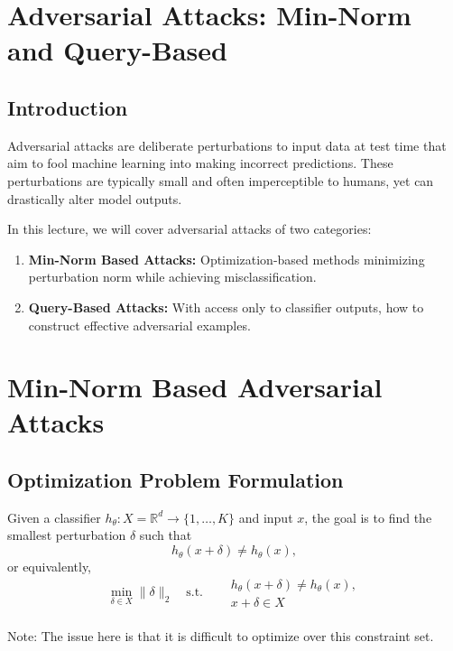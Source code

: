 \documentclass[11pt]{report}
\begin{document}

\maketitle


\section{Adversarial Attacks: Min-Norm and Query-Based}

\subsection*{Introduction}
Adversarial attacks are deliberate perturbations to input data at test time that aim to fool machine learning into making incorrect predictions. These perturbations are typically small and often imperceptible to humans, yet can drastically alter model outputs.

In this lecture, we will cover adversarial attacks of two categories:
\begin{enumerate}
    \item \textbf{Min-Norm Based Attacks:} Optimization-based methods minimizing perturbation norm while achieving misclassification.
    \item \textbf{Query-Based Attacks:} With access only to classifier outputs, how to construct effective adversarial examples.
\end{enumerate}

\section{Min-Norm Based Adversarial Attacks}

\subsection*{Optimization Problem Formulation}
Given a classifier $h_\theta: X=\mathbb{R}^d \to \{1, \dots, K\}$ and input $x$, the goal is to find the smallest perturbation $\delta$ such that
\[
    h_\theta(x + \delta) \neq h_\theta(x),
\]
or equivalently,
\[
\min_{\delta \in X} \|\delta\|_2
\quad\text{s.t.}\quad
\begin{aligned}
  & h_\theta(x+\delta) \neq h_\theta(x), \\[1.2ex] %
  & x+\delta \in X
\end{aligned}
\]
\\
Note: The issue here is that it is difficult to optimize over this constraint set.
\end{document}
